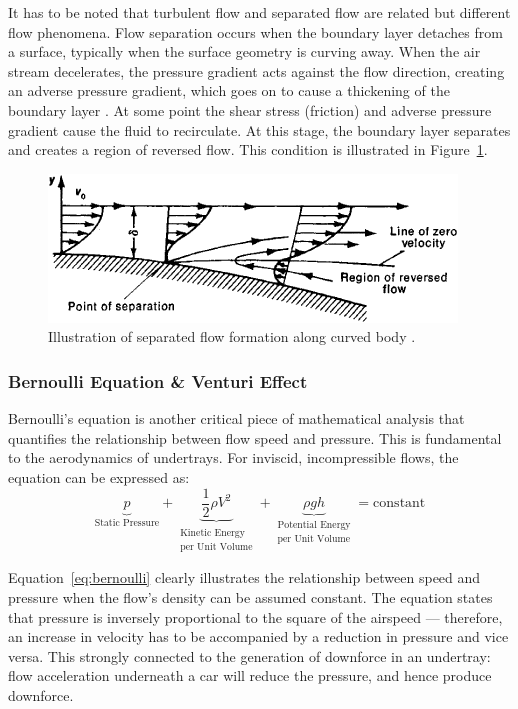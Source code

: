 \noindent It has to be noted that turbulent flow and separated flow are related but different flow phenomena. Flow separation occurs when the boundary layer detaches from a surface, typically when the surface geometry is curving away. When the air stream decelerates, the pressure gradient acts against the flow direction, creating an adverse pressure gradient, which goes on to cause a thickening of the boundary layer \cite{Scibor-Rylski1984RoadAerodynamics}. At some point the shear stress (friction) and adverse pressure gradient cause the fluid to recirculate. At this stage, the boundary layer separates and creates a region of reversed flow. This condition is illustrated in Figure~\ref{fig:flow separation}.

\begin{figure}[!ht]
    \centering
    \includegraphics[scale= 0.8]{Figures/flow_separation.png}
    \caption{Illustration of separated flow formation along curved body \cite{Anonymous1979SeparationDictionary}.}
    \label{fig:flow separation}
\end{figure}

\subsubsection{Bernoulli Equation \& Venturi Effect}
Bernoulli's equation is another critical piece of mathematical analysis that quantifies the relationship between flow speed and pressure. This is fundamental to the aerodynamics of undertrays. For inviscid, incompressible flows, the equation can be expressed as:
\begin{equation}
   \underbrace{p}_\textrm{Static Pressure} + \underbrace{\frac{1}{2} \rho V^{2}}_{\substack{\text{Kinetic Energy} \\ \text{per Unit Volume}}} + \underbrace{\rho g h}_{\substack{\text{Potential Energy} \\ \text{per Unit Volume}}} = \text{constant}
    \label{eq:bernoulli}
\end{equation}

\noindent Equation~\ref{eq:bernoulli} clearly illustrates the relationship between speed and pressure when the flow's density can be assumed constant. The equation states that pressure is inversely proportional to the square of the airspeed --- therefore, an increase in velocity has to be accompanied by a reduction in pressure and vice versa. This strongly connected to the generation of downforce in an undertray: flow acceleration underneath a car will reduce the pressure, and hence produce downforce.

